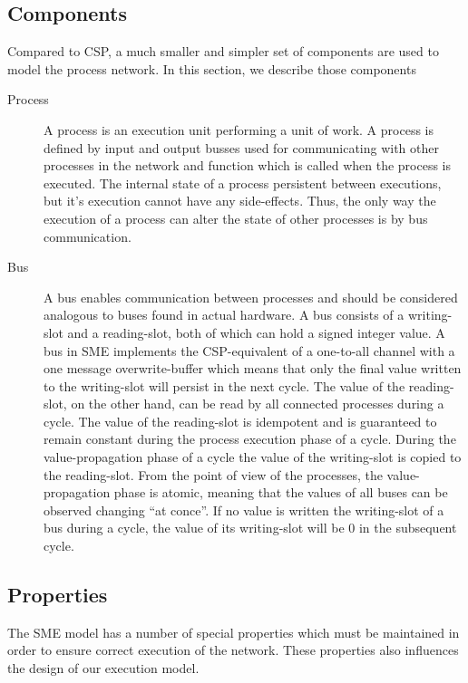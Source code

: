 \subsection{Components}
Compared to CSP, a much smaller and simpler set of components are used
to model the process network. In this section, we describe those
components

\begin{description}
\item[Process] A process is an execution unit performing a unit of
  work. A process is defined by input and output busses used for
  communicating with other processes in the network and function which
  is called when the process is executed. The internal state of a
  process persistent between executions, but it's execution cannot
  have any side-effects. Thus, the only way the execution of a process
  can alter the state of other processes is by bus communication.
\item[Bus] A bus enables communication between processes and should be
  considered analogous to buses found in actual hardware. A bus
  consists of a writing-slot and a reading-slot, both of which can
  hold a signed integer value. A bus in SME implements the
  CSP-equivalent of a one-to-all channel with a one message
  overwrite-buffer which means that only the final value written to
  the writing-slot will persist in the next cycle. The value of the
  reading-slot, on the other hand, can be read by all connected
  processes during a cycle. The value of the reading-slot is
  idempotent and is guaranteed to remain constant during the process
  execution phase of a cycle. During the value-propagation phase of a
  cycle the value of the writing-slot is copied to the
  reading-slot. From the point of view of the processes, the
  value-propagation phase is atomic, meaning that the values of all
  buses can be observed changing ``at conce''. If no value is written
  the writing-slot of a bus during a cycle, the value of its
  writing-slot will be 0 in the subsequent cycle.

\end{description}

\subsection{Properties}
The SME model has a number of special properties which must be
maintained in order to ensure correct execution of the network. These
properties also influences the design of our execution model.

